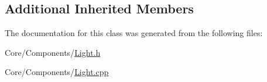\subsection*{Additional Inherited Members}


The documentation for this class was generated from the following files\-:\begin{DoxyCompactItemize}
\item 
Core/\-Components/\hyperlink{Light_8h}{Light.\-h}\item 
Core/\-Components/\hyperlink{Light_8cpp}{Light.\-cpp}\end{DoxyCompactItemize}
